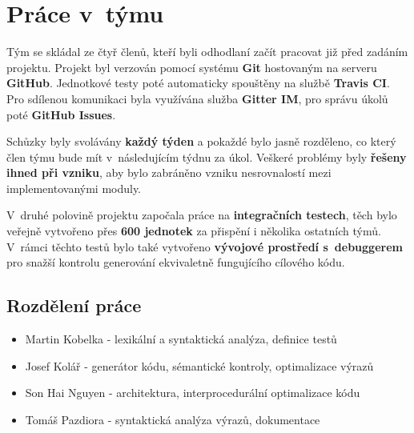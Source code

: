 \section{Práce v~týmu}
Tým se skládal ze čtyř členů, kteří byli odhodlaní začít
pracovat již před zadáním projektu. Projekt byl verzován pomocí systému \textbf{Git} hostovaným na serveru \textbf{GitHub}. Jednotkové testy poté automaticky spouštěny na službě \textbf{Travis CI}. Pro sdílenou komunikaci byla využívána služba \textbf{Gitter IM}, pro správu úkolů poté \textbf{GitHub Issues}.

Schůzky byly svolávány \textbf{každý týden} a pokaždé bylo jasně rozděleno, co který člen týmu bude mít v~následujícím týdnu za úkol. Veškeré problémy byly \textbf{řešeny ihned při vzniku}, aby bylo zabráněno vzniku nesrovnalostí mezi implementovanými moduly.

V~druhé polovině projektu započala práce na \textbf{integračních testech}, těch bylo veřejně vytvořeno přes \textbf{600 jednotek} za přispění i několika ostatních týmů. V~rámci těchto testů bylo také vytvořeno \textbf{vývojové prostředí s~debuggerem} pro snažší kontrolu generování ekvivaletně fungujícího cílového kódu.

\subsection{Rozdělení práce}
\begin{itemize}
    \item Martin Kobelka - lexikální a syntaktická analýza, definice testů
    \item Josef Kolář - generátor kódu, sémantické kontroly, optimalizace výrazů
    \item Son Hai Nguyen - architektura, interprocedurální optimalizace kódu
    \item Tomáš Pazdiora - syntaktická analýza výrazů, dokumentace
\end{itemize}